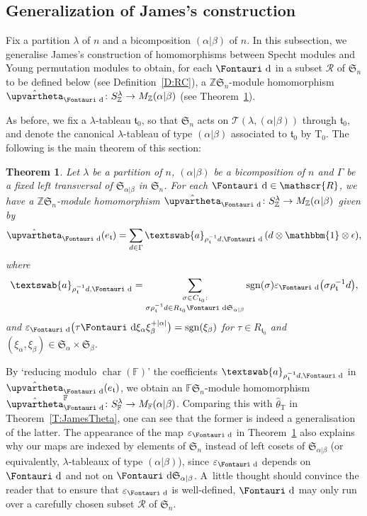 \documentclass[pdftex]{sigma}
\newtheorem{Theorem}{Theorem}[section]
\renewcommand{\t}{\mathfrak{t}}
\renewcommand{\a}{\textswab{a}}
\newcommand{\TT}{\mathscr{T}}
\newcommand{\T}{\mathrm{T}}
\newcommand{\sgn}{\mathrm{sgn}}
\newcommand{\Char}{\operatorname{\mathrm{char}}}
\newcommand{\sym}[1]{\mathfrak{S}_{#1}}
\newcommand{\F}{\mathbb{F}}
\newcommand{\bb}[1]{\mathbbm{{#1}}}
\newcommand{\R}{\mathscr{R}}
\newcommand{\dR}{\text{\Fontauri d}}
\newcommand{\Z}{\mathbb{Z}}
\newcommand{\Jhom}{\upvartheta}
\newcommand{\hJhom}{\hat{\Jhom}}
\begin{document}
\subsection{Generalization of James's construction} \label{S:construction}
Fix a partition $\lambda$ of $n$ and a bicomposition $(\alpha|\beta)$ of $n$. In this subsection, we generalise James's construction of homomorphisms between Specht modules and Young permutation modules to obtain, for each $\dR$ in a subset $\R$ of $\sym{n}$ to be defined below (see Definition~\ref{D:RC}), a $\Z\sym{n}$-module homomorphism $\hJhom_\dR\colon S^\lambda_\Z \to M_\Z(\alpha|\beta)$ (see Theorem~\ref{T: hom}).


As before, we fix a $\lambda$-tableau $\t_0$, so that $\sym{n}$ acts on $\TT(\lambda, (\alpha|\beta))$ through $\t_0$, and denote the canonical $\lambda$-tableau of type $(\alpha|\beta)$ associated to $\t_0$ by $\T_0$. The following is the main theorem of this section:

\begin{Theorem}\label{T: hom}
	Let $\lambda$ be a partition of $n$, $(\alpha|\beta)$ be a bicomposition of $n$ and $\Gamma$ be a fixed left transversal of $\sym{\alpha|\beta}$ in $\sym{n}$. For each $\dR \in\R$, we have a $\Z\sym{n}$-module homomorphism $\hJhom_{\dR}\colon S_\Z^\lambda \to M_\Z(\alpha|\beta)$ given by
	\begin{gather*}
	\hJhom_{\dR}(e_{\t})=\sum_{d\in\Gamma} \a_{\rho_{\t}^{-1}d,\dR}\,(d \otimes \bb{1} \otimes \epsilon),\end{gather*}
	where \begin{gather*}\a_{\rho_{\t}^{-1}d, \dR} = \sum_{\substack{\sigma \in C_{\t_0} : \\ \sigma \rho_{\t}^{-1}d \in R_{\t_0} \dR \sym{\alpha|\beta} }} \sgn(\sigma)\varepsilon_\dR\big(\sigma \rho_{\t}^{-1}d\big),\end{gather*} and $\varepsilon_\dR\big(\tau \dR \xi_{\alpha}\xi_{\beta}^{+|\alpha|}\big) = \sgn(\xi_{\beta})$ for $\tau \in R_{\t_0}$ and $(\xi_{\alpha}, \xi_{\beta}) \in \sym{\alpha} \times \sym{\beta}$.
\end{Theorem}

By `reducing modulo $\Char(\F)$' the coefficients $\a_{\rho_{\t}^{-1}d, \dR}$ in $\hJhom_{\dR}(e_{\t})$, we obtain an $\F\sym{n}$-module homomorphism $\hJhom_{\dR}^\F\colon S^\lambda_\F\to M_\F(\alpha|\beta)$. Comparing this with $\hat{\theta}_{\T}$ in Theorem~\ref{T:JamesTheta}, one can see that the former is indeed a generalisation of the latter. The appearance of the map $\varepsilon_\dR$ in Theo\-rem~\ref{T: hom} also explains why our maps are indexed by elements of $\sym{n}$ instead of left cosets of $\sym{\alpha|\beta}$ (or equivalently, $\lambda$-tableaux of type $(\alpha|\beta)$), since $\varepsilon_\dR$ depends on $\dR$ and not on $\dR\sym{\alpha|\beta}$. A~little thought should convince the reader that to ensure that $\varepsilon_{\dR}$ is well-defined, $\dR$ may only run over a carefully chosen subset $\R$ of $\sym{n}$.
\end{document}

